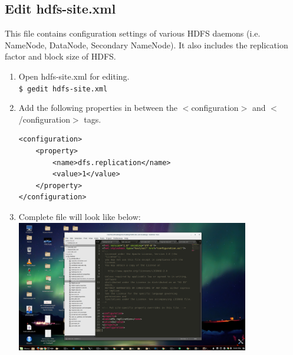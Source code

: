 \documentclass[12pt]{article}%
\begin{document}
\subsection{Edit hdfs-site.xml}
This file contains configuration
settings of various HDFS daemons (i.e. NameNode, DataNode, Secondary
NameNode). It also includes the replication factor and block size of
HDFS.
\begin{enumerate}
\item Open hdfs-site.xml for editing.\\
\lstinline{$ gedit hdfs-site.xml}
\item Add the following properties in between the $<$configuration$>$ and $<$/configuration$>$ tags.\\
\begin{lstlisting}
<configuration>
	<property>
		<name>dfs.replication</name>
		<value>1</value>
	</property>
</configuration> 
\end{lstlisting}
\item Complete file will look like below:\\
\includegraphics[width=0.8\textwidth]{hdfs-env.png}
\end{enumerate}
\end{document}

